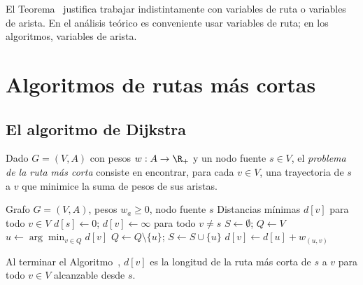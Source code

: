 \begin{remark}
El Teorema~ justifica trabajar indistintamente con variables de ruta o variables de arista. En el análisis teórico es conveniente usar variables de ruta; en los algoritmos, variables de arista.
\end{remark}

\section{Algoritmos de rutas más cortas}

\subsection{El algoritmo de Dijkstra}

\begin{definition}
Dado $G = (V, A)$ con pesos $w : A \to \R_+$ y un nodo fuente $s \in V$, el \emph{problema de la ruta más corta} consiste en encontrar, para cada $v \in V$, una trayectoria de $s$ a $v$ que minimice la suma de pesos de sus aristas.
\end{definition}

\begin{algorithm}
\caption{Dijkstra (1959)}
\label{alg:dijkstra}
\begin{algorithmic}[1]
\Require Grafo $G=(V,A)$, pesos $w_a \geq 0$, nodo fuente $s$
\Ensure Distancias mínimas $d[v]$ para todo $v \in V$
\State $d[s] \leftarrow 0$; $d[v] \leftarrow \infty$ para todo $v \neq s$
\State $S \leftarrow \emptyset$; $Q \leftarrow V$ 
    \State $u \leftarrow \arg\min_{v \in Q} d[v]$
    \State $Q \leftarrow Q \setminus \{u\}$; $S \leftarrow S \cup \{u\}$
            \State $d[v] \leftarrow d[u] + w_{(u,v)}$
        \EndIf
    \EndFor
\EndWhile
\end{algorithmic}
\end{algorithm}

\begin{theorem}
Al terminar el Algoritmo~, $d[v]$ es la longitud de la ruta más corta de $s$ a $v$ para todo $v \in V$ alcanzable desde $s$.
\end{theorem}

